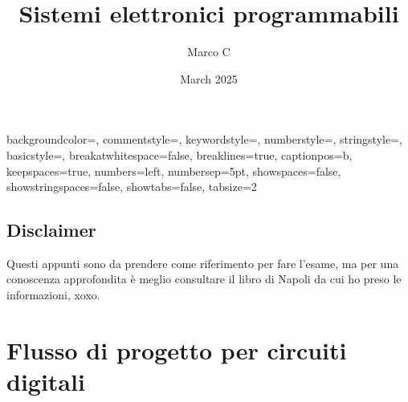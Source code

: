 \documentclass{book}
\title{Sistemi elettronici programmabili}
\author{Marco C}
\date{March 2025}
\begin{document}
    {
        backgroundcolor=\color{backcolour},   
    commentstyle=\color{vgreen},
    keywordstyle=\color{vblue},
    numberstyle=\tiny\color{vorange},
    stringstyle=\color{vorange},
    basicstyle=\ttfamily\footnotesize,
    breakatwhitespace=false,         
    breaklines=true,                 
    captionpos=b,                    
    keepspaces=true,                 
    numbers=left,                    
    numbersep=5pt,                  
    showspaces=false,                
    showstringspaces=false,
    showtabs=false,                  
    tabsize=2
    }
    \lstset{style=verilog-style}

\maketitle

\section*{Disclaimer}
    Questi appunti sono da prendere come riferimento per fare l'esame, ma per una conoscenza approfondita è meglio consultare il libro di Napoli da cui ho preso le informazioni, xoxo.
\chapter{Flusso di progetto per circuiti digitali}
\end{document}

